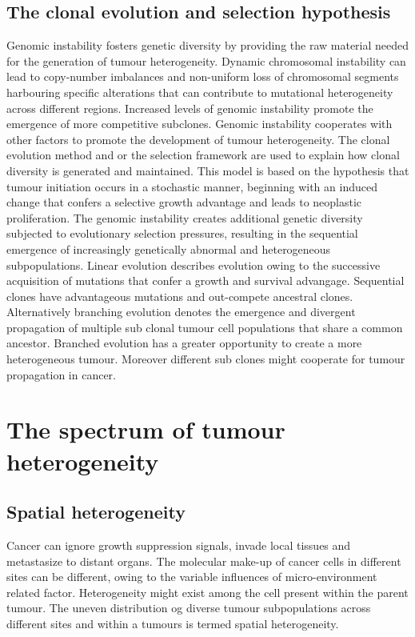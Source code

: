 	\subsection{The clonal evolution and selection hypothesis}
	Genomic instability fosters genetic diversity by providing the raw material needed for the generation of tumour heterogeneity.
	Dynamic chromosomal instability can lead to copy-number imbalances and non-uniform loss of chromosomal segments harbouring specific alterations that can contribute to mutational heterogeneity across different regions.
	Increased levels of genomic instability promote the emergence of more competitive subclones.
	Genomic instability cooperates with other factors to promote the development of tumour heterogeneity.
	The clonal evolution method and or the selection framework are used to explain how clonal diversity is generated and maintained.
	This model is based on the hypothesis that tumour initiation occurs in a stochastic manner, beginning with an induced change that confers a selective growth advantage and leads to neoplastic proliferation.
	The genomic instability creates additional genetic diversity subjected to evolutionary selection pressures, resulting in the sequential emergence of increasingly genetically abnormal and heterogeneous subpopulations.
	Linear evolution describes evolution owing to the successive acquisition of mutations that confer a growth and survival advangage.
	Sequential clones have advantageous mutations and out-compete ancestral clones.
	Alternatively branching evolution denotes the emergence and divergent propagation of multiple sub clonal tumour cell populations that share a common ancestor.
	Branched evolution has a greater opportunity to create a more heterogeneous tumour.
	Moreover different sub clones might cooperate for tumour propagation in cancer.

\section{The spectrum of tumour heterogeneity}

	\subsection{Spatial heterogeneity}
	Cancer can ignore growth suppression signals, invade local tissues and metastasize to distant organs.
	The molecular make-up of cancer cells in different sites can be different, owing to the variable influences of micro-environment related factor.
	Heterogeneity might exist among the cell present within the parent tumour.
	The uneven distribution og diverse tumour subpopulations across different sites and within a tumours is termed spatial heterogeneity.

